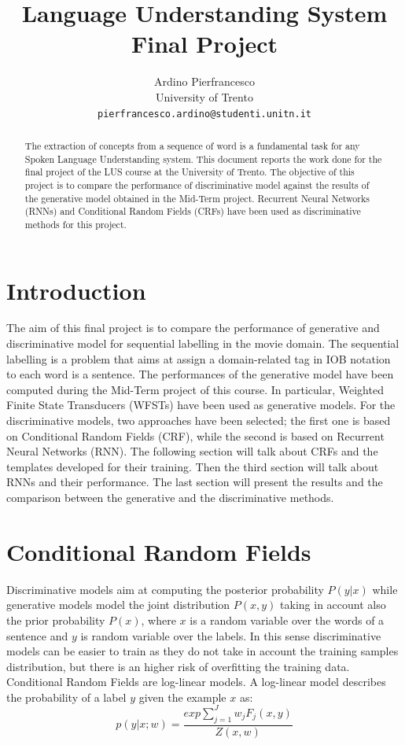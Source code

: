 \documentclass[11pt,a4paper]{article}
\title{Language Understanding System Final Project}
\author{Ardino Pierfrancesco \\
  University of Trento \\
  {\tt pierfrancesco.ardino@studenti.unitn.it}}
\date{}
\begin{document}
\maketitle
\begin{abstract}
    The extraction of concepts from a sequence of word is a fundamental task for any Spoken Language Understanding system. This document reports the work done for the final project of the LUS course at the University of Trento. The objective of this project is to compare the performance of discriminative model against the results of the generative model obtained in the Mid-Term project. Recurrent Neural Networks (RNNs) and Conditional Random Fields (CRFs) have been used as discriminative methods for this project.
\end{abstract}


\section{Introduction}

The aim of this final project is to compare the performance of generative and discriminative model for sequential labelling in the movie domain. The sequential labelling is a problem that aims at assign a domain-related tag in IOB notation to each word is a sentence. The performances of the generative model have been computed during the Mid-Term project of this course. In particular, Weighted Finite State Transducers (WFSTs) have been used as generative models. For the discriminative models, two approaches have been selected; the first one is based on Conditional Random Fields (CRF), while the second is based on Recurrent Neural Networks (RNN). The following section will talk about CRFs and the templates developed for their training. Then the third section will talk about RNNs and their performance. The last section will present the results and the comparison between the generative and the discriminative methods.

\section{Conditional Random Fields}

Discriminative models aim at computing the posterior probability $P (y|x)$
while generative models model the joint distribution $P(x,y)$ taking in account also the prior probability $P(x)$, where $x$ is a random variable over the words of a  sentence and $y$ is random variable over the labels. In this sense discriminative models can be easier to train as they do not take in account the training samples distribution, but there is an higher risk of overfitting the training data. \\
Conditional Random Fields are log-linear models\cite{elkan2008log}.
A log-linear model describes the probability of a label $y$ given the example $x$ as:
\begin{equation}
    p(y|x;w) = \frac{exp \sum_{j = 1}^{J} w_{j}F_{j}(x, y)}{Z(x, w)}
\end{equation}
\end{document}
